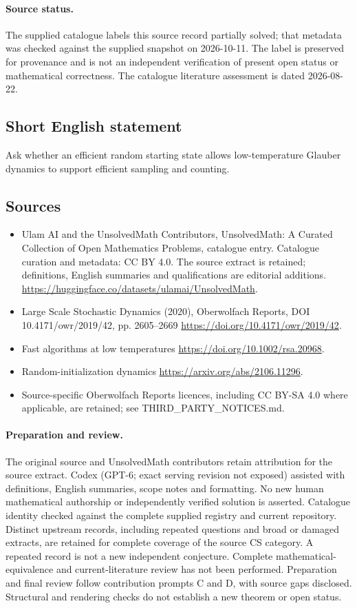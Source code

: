 \documentclass[11pt]{article}
\begin{document}
\paragraph{Source status.}
The supplied catalogue labels this source record partially solved; that metadata was checked against the supplied snapshot on 2026-10-11. The label is preserved for provenance and is not an independent verification of present open status or mathematical correctness. The catalogue literature assessment is dated 2026-08-22.
\subsection{Short English statement}
Ask whether an efficient random starting state allows low-temperature Glauber dynamics to support efficient sampling and counting.
\subsection{Sources}
\begin{itemize}
\item[\hypertarget{source:statement:1}{S1}] Ulam AI and the UnsolvedMath Contributors, UnsolvedMath: A Curated Collection of Open Mathematics Problems, catalogue entry. Catalogue curation and metadata: CC BY 4.0. The source extract is retained; definitions, English summaries and qualifications are editorial additions.
\url{https://huggingface.co/datasets/ulamai/UnsolvedMath}.
\item[\hypertarget{source:statement:2}{S2}] Large Scale Stochastic Dynamics (2020), Oberwolfach Reports, DOI 10.4171/owr/2019/42, pp. 2605--2669
\url{https://doi.org/10.4171/owr/2019/42}.
\item[\hypertarget{source:statement:3}{S3}] Fast algorithms at low temperatures
\url{https://doi.org/10.1002/rsa.20968}.
\item[\hypertarget{source:statement:4}{S4}] Random-initialization dynamics
\url{https://arxiv.org/abs/2106.11296}.
\item Source-specific Oberwolfach Reports licences, including CC BY-SA 4.0 where applicable, are retained; see THIRD\_PARTY\_NOTICES.md.
\end{itemize}
\paragraph{Preparation and review.}
The original source and UnsolvedMath contributors retain attribution for the source extract. Codex (GPT-6; exact serving revision not exposed) assisted with definitions, English summaries, scope notes and formatting. No new human mathematical authorship or independently verified solution is asserted. Catalogue identity checked against the complete supplied registry and current repository. Distinct upstream records, including repeated questions and broad or damaged extracts, are retained for complete coverage of the source CS category. A repeated record is not a new independent conjecture. Complete mathematical-equivalence and current-literature review has not been performed. Preparation and final review follow contribution prompts C and D, with source gaps disclosed. Structural and rendering checks do not establish a new theorem or open status.
\label{end:statement}
\end{document}
